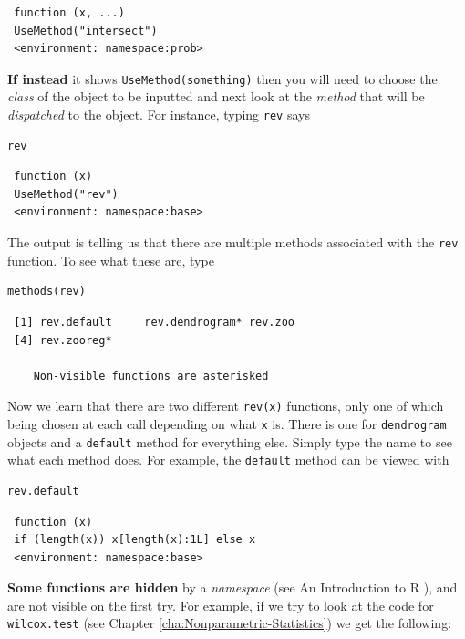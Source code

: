 \documentclass[captions=tableheading]{scrbook}
\begin{document}
\begin{verbatim}
 function (x, ...) 
 UseMethod("intersect")
 <environment: namespace:prob>
\end{verbatim}

\textbf{If instead} it shows \texttt{UseMethod(something)} then you will need to choose the \emph{class} of the object to be inputted and next look at the \emph{method} that will be \emph{dispatched} to the object. For instance, typing \texttt{rev} says 


\begin{verbatim}
rev
\end{verbatim}

\begin{verbatim}
 function (x) 
 UseMethod("rev")
 <environment: namespace:base>
\end{verbatim}

The output is telling us that there are multiple methods associated with the \texttt{rev} function. To see what these are, type


\begin{verbatim}
methods(rev)
\end{verbatim}

\begin{verbatim}
 [1] rev.default     rev.dendrogram* rev.zoo        
 [4] rev.zooreg*    
 
    Non-visible functions are asterisked
\end{verbatim}

Now we learn that there are two different \texttt{rev(x)} functions, only one of which being chosen at each call depending on what \texttt{x} is. There is one for \texttt{dendrogram} objects and a \texttt{default} method for everything else. Simply type the name to see what each method does. For example, the \texttt{default} method can be viewed with


\begin{verbatim}
rev.default
\end{verbatim}

\begin{verbatim}
 function (x) 
 if (length(x)) x[length(x):1L] else x
 <environment: namespace:base>
\end{verbatim}

\textbf{Some functions are hidden} by a \emph{namespace} (see An Introduction to \textsf{R} \cite{Venables2010}), and are not visible on the first try. For example, if we try to look at the code for \texttt{wilcox.test} (see Chapter \ref{cha:Nonparametric-Statistics}) we get the following:
\end{document}
